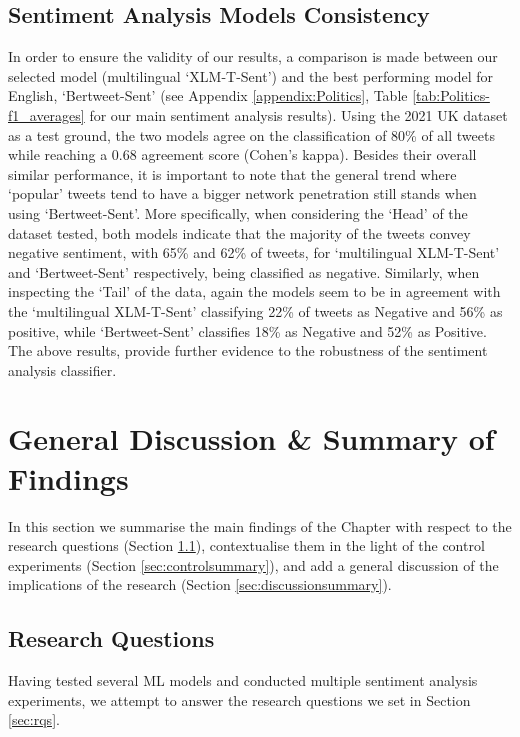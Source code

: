 \subsection{Sentiment Analysis Models Consistency}\label{sec:sentiment_analysis_models}

In order to ensure the validity of our results, a comparison is made between our selected model (multilingual `XLM-T-Sent') 
and the best performing model for English, `Bertweet-Sent' (see Appendix \ref{appendix:Politics}, Table \ref{tab:Politics-f1_averages} for our main sentiment analysis results). Using the 2021 UK dataset as a test ground, the two models agree on the classification of 80\% of all tweets while reaching a 0.68 agreement score (Cohen's kappa). Besides their overall similar performance, it is important to note that the general trend where `popular' tweets tend to have a bigger network penetration still stands when using `Bertweet-Sent'. More specifically, when considering the `Head' of the dataset tested, both models indicate that the majority of the tweets convey negative sentiment, with 65\% and 62\% of tweets, for `multilingual XLM-T-Sent' and `Bertweet-Sent' respectively, being classified as negative. Similarly, when inspecting the `Tail' of the data, again the models seem to be in agreement with the `multilingual XLM-T-Sent' classifying  22\% of tweets as Negative  and 56\% as positive, while `Bertweet-Sent' classifies 18\% as Negative and 52\% as Positive. The above results, provide further evidence to the robustness of the sentiment analysis classifier.


\section{General Discussion \& Summary of Findings}
\label{sec:summary}

In this section we summarise the main findings of the Chapter with respect to the research questions (Section \ref{sec:RQsummary}), contextualise them in the light of the control experiments (Section \ref{sec:controlsummary}), and add a general discussion of the implications of the research (Section \ref{sec:discussionsummary}). 

\subsection{Research Questions}
\label{sec:RQsummary}
Having tested several \ac{ML} models and conducted multiple sentiment analysis experiments, we attempt to answer the research questions we set in Section \ref{sec:rqs}.

